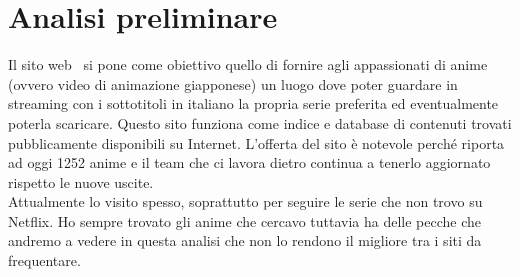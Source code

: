 \section{Analisi preliminare}
Il sito web \nomeSito \ si pone come obiettivo quello di fornire agli appassionati di anime (ovvero video di animazione giapponese) un luogo dove poter guardare in streaming con i sottotitoli in italiano la propria serie preferita ed eventualmente poterla scaricare. Questo sito funziona come indice e database di contenuti trovati pubblicamente disponibili su Internet. L'offerta del sito è notevole perché riporta ad oggi 1252 anime e il team che ci lavora dietro continua a tenerlo aggiornato rispetto le nuove uscite. \\
Attualmente lo visito spesso, soprattutto per seguire le serie che non trovo su Netflix. Ho sempre trovato gli anime che cercavo tuttavia ha delle pecche che andremo a vedere in questa analisi che non lo rendono il migliore tra i siti da frequentare.
